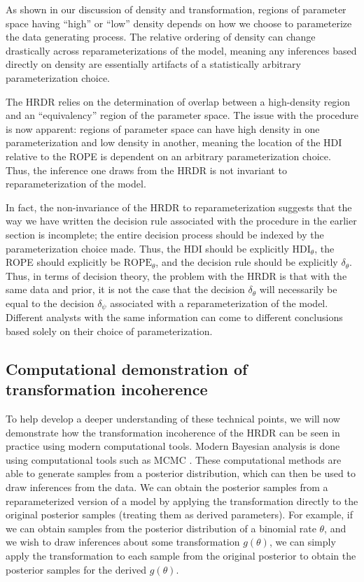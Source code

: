 \documentclass[9pt,twocolumn,twoside]{cidlab-draft}\templatetype{cidlab-invited}
\newcommand{\hdr}{HRDR}
\begin{document}
As shown in our discussion of density and transformation, regions of parameter space having ``high'' or ``low'' density depends on how we choose to parameterize the data generating process. The relative ordering of density can change drastically across reparameterizations of the model, meaning any inferences based directly on density are essentially artifacts of a statistically arbitrary parameterization choice. 

The \hdr{} relies on the determination of overlap between a high-density region and an ``equivalency'' region of the parameter space. The issue with the procedure is now apparent: regions of parameter space can have high density in one parameterization and low density in another, meaning the location of the HDI relative to the ROPE is dependent on an arbitrary parameterization choice.  Thus, the inference one draws from the \hdr{} is not invariant to reparameterization of the model. 

In fact, the non-invariance of the \hdr{} to reparameterization suggests that the way we have written the decision rule associated with the procedure in the earlier section is incomplete; the entire decision process should be indexed by the parameterization choice made. Thus, the HDI should be explicitly $\text{HDI}_\theta$, the ROPE should explicitly be $\text{ROPE}_\theta$, and the decision rule should be explicitly $\delta_\theta$. Thus, in terms of decision theory, the problem with the \hdr{} is that with the same data and prior, it is not the case that the decision $\delta_\theta$ will necessarily be equal to the decision $\delta_\psi$ associated with a reparameterization of the model. Different analysts with the same information can come to different conclusions based solely on their choice of parameterization.



\subsection{Computational demonstration of transformation incoherence}

To help develop a deeper understanding of these technical points, we will now demonstrate how the transformation incoherence of the \hdr{} can be seen in practice using modern computational tools. 
Modern Bayesian analysis is done using computational tools such as MCMC \cite{vanravenzwaaijSI}. These computational methods are able to generate samples from a posterior distribution, which can then be used to draw inferences from the data. We can obtain the posterior samples from a reparameterized version of a model by applying the transformation directly to the original posterior samples (treating them as derived parameters). For example, if we can obtain samples from the posterior distribution of a binomial rate $\theta$, and we wish to draw inferences about some transformation $g(\theta)$, we can simply apply the transformation to each sample from the original posterior to obtain the posterior samples for the derived $g(\theta)$. 
\end{document}
